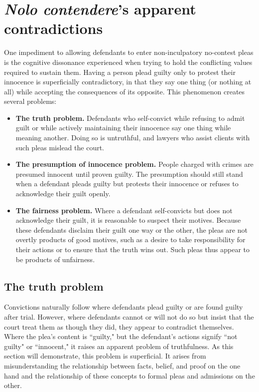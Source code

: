 \section{\textit{Nolo contendere}'s apparent contradictions}

One impediment to allowing defendants to enter non-inculpatory no-contest pleas is the cognitive dissonance experienced when trying to hold the conflicting values required to sustain them. Having a person plead guilty only to protest their innocence is superficially contradictory, in that they say one thing (or nothing at all) while accepting the consequences of its opposite. This phenomenon creates several problems:

\begin{itemize}
    \item \textbf{The truth problem.} Defendants who self-convict while refusing to admit guilt or while actively maintaining their innocence say one thing while meaning another. Doing so is untruthful, and lawyers who assist clients with such pleas mislead the court. 
    \item \textbf{The presumption of innocence problem.} People charged with crimes are presumed innocent until proven guilty. The presumption should still stand when a defendant pleads guilty but protests their innocence or refuses to acknowledge their guilt openly.
    \item \textbf{The fairness problem.} Where a defendant self-convicts but does not acknowledge their guilt, it is reasonable to suspect their motives. Because these defendants disclaim their guilt one way or the other, the pleas are not overtly products of good motives, such as a desire to take responsibility for their actions or to ensure that the truth wins out. Such pleas thus appear to be products of unfairness. 
\end{itemize}

\subsection{The truth problem}

Convictions naturally follow where defendants plead guilty or are found guilty after trial. However, where defendants cannot or will not do so but insist that the court treat them as though they did, they appear to contradict themselves. Where the plea's content is ``guilty," but the defendant's actions signify ``not guilty" or ``innocent," it raises an apparent problem of truthfulness. As this section will demonstrate, this problem is superficial. It arises from misunderstanding the relationship between facts, belief, and proof on the one hand and the relationship of these concepts to formal pleas and admissions on the other.

